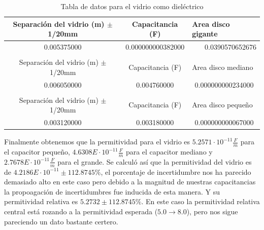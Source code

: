 \documentclass[article,12pt]{elsarticle}
\begin{document}
\begin{table}[H]
\centering
\begin{tabular}{ccl}
\hline
\multicolumn{1}{|c|}{Separación del vidrio (m) $\pm$ 1/20mm} & \multicolumn{1}{c|}{Capacitancia (F)}  & \multicolumn{1}{l|}{Area disco gigante} \\ \hline
\multicolumn{1}{|c|}{0.005375000}                            & \multicolumn{1}{c|}{0.000000000382000} & \multicolumn{1}{r|}{0.0390570652676}    \\ \hline
\multicolumn{1}{l}{}                                         & \multicolumn{1}{l}{}                   &                                         \\ \hline
\multicolumn{1}{|c|}{Separación del vidrio (m) $\pm$ 1/20mm} & \multicolumn{1}{c|}{Capacitancia (F)}  & \multicolumn{1}{l|}{Area disco mediano} \\ \hline
\multicolumn{1}{|c|}{0.006050000}                            & \multicolumn{1}{c|}{0.004760000}       & \multicolumn{1}{c|}{0.000000000234000}  \\ \hline
\multicolumn{1}{l}{}                                         & \multicolumn{1}{l}{}                   &                                         \\ \hline
\multicolumn{1}{|c|}{Separación del vidrio (m) $\pm$ 1/20mm} & \multicolumn{1}{c|}{Capacitancia (F)}  & \multicolumn{1}{l|}{Area disco pequeño} \\ \hline
\multicolumn{1}{|c|}{0.003120000}                            & \multicolumn{1}{c|}{0.003180000}       & \multicolumn{1}{c|}{0.000000000067000}  \\ \hline
\end{tabular}
\caption{Tabla de datos para el vidrio como dieléctrico}
\end{table}

Finalmente obtenemos que la permitividad para el vidrio es $5.2571 \cdot 10^{-11} \frac{F}{m}$ para el capacitor pequeño, $4.6308E \cdot 10^{-11} \frac{F}{m}$ para el capacitor mediano y $2.7678E \cdot 10^{-11}\frac{F}{m}$ para el grande. Se calculó así que la permitividad del vidrio es de $4.2186E \cdot 10^{-11} \pm 112.8745\%$, el porcentaje de incertidumbre nos ha parecido demasiado alto en este caso pero debido a la magnitud de nuestras capacitancias la propoagación de incertidumbres fue inducida de esta manera. Y su permitividad relativa es $5.2732 \pm 112.8745 \%$. En este caso la permitividad relativa central está rozando a la permitividad esperada ($5.0\rightarrow 8.0$), pero nos sigue pareciendo un dato bastante certero.
\end{document}
